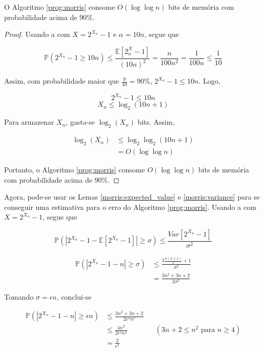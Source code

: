 \begin{lemma}
  O Algoritmo \ref{prog:morris} consome $O(\log \log n)$ bits de memória com probabilidade acima de $90\%$.
\end{lemma}

\begin{proof}
  Usando a  com $X = 2^{X_n} - 1$ e $\alpha = 10n$, segue que

\[ \mathbb{P}(2^{X_n} - 1 \geq 10n)  \leq \frac{\mathbb{E}[2^X_n - 1]}{(10n)^2} = \frac{n}{100n^2} = \frac{1}{100n} \leq \frac{1}{10} \]

Assim, com probabilidade maior que $\frac{9}{10} = 90\%$, $2^{X_n} - 1 \leq 10n$. Logo, 

\[ 2^{X_n} - 1 \leq 10n  \]
\[ X_n \leq \log_2(10n + 1)\]

Para armazenar $X_n$, gasta-se $\log_2(X_n)$ bits. Assim,

\begin{align*}
  \log_2(X_n) 
    &\leq \log_2\log_2(10n + 1) \\ 
    &= O(\log \log n)
\end{align*} 

Portanto, o Algoritmo \ref{prog:morris} consome $O(\log \log n)$ bits de memória com probabilidade acima de $90\%$.

\end{proof}

Agora, pode-se usar os Lemas \ref{morris:expected_value} e \ref{morris:variance} para se conseguir uma estimativa para o 
erro do Algoritmo \ref{prog:morris}.
Usando a  com $X = 2^{X_n} - 1$, segue que

\[ \mathbb{P}(|2^{X_n} - 1 - \mathbb{E}[2^{X_n} - 1]| \geq \sigma ) \leq \frac{Var[2^{X_n} - 1]}{\sigma^2}\]

\begin{align*}
  \mathbb{P}(|2^{X_n} - 1 - n| \geq \sigma ) 
    &\leq \frac{3\frac{n(n+1)}{2} + 1}{\sigma^2}  \\
    &= \frac{3n^2 + 3n + 2}{2\sigma^2}
\end{align*}


Tomando $\sigma = \epsilon n$, conclui-se

\begin{align*}
  \mathbb{P}(|2^{X_n} - 1 - n| \geq \epsilon n) 
    &\leq \frac{3n^2 + 3n + 2}{2 \epsilon^2 n^2}  \\
    &\leq \frac{4n^2}{2 \epsilon^2 n^2}  &&(\text{$3n + 2 \leq n^2$ para $n \geq 4$}) \\
    &= \frac{2}{\epsilon^2}
\end{align*}

